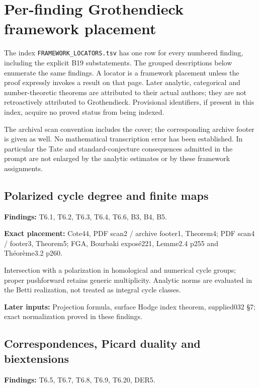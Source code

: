 \documentclass[11pt,a4paper]{article}
\theoremstyle{definition}
\begin{document}
\section{Per-finding Grothendieck framework placement}

The index \texttt{FRAMEWORK\_LOCATORS.tsv} has one row for every
numbered finding, including the explicit B19 substatements. The grouped
descriptions below enumerate the same findings. A locator is a framework
placement unless the proof expressly invokes a result on that page.
Later analytic, categorical and number-theoretic theorems are attributed
to their actual authors; they are not retroactively attributed to
Grothendieck. Provisional identifiers, if present in this index, acquire
no proved status from being indexed.

The archival scan convention includes the cover; the corresponding
archive footer is given as well. No mathematical transcription error has
been established. In particular the Tate and standard-conjecture
consequences admitted in the prompt are not enlarged by the analytic
estimates or by these framework assignments.

\subsection{Polarized cycle degree and finite
maps}\label{FRAMEWORK-polarized-cycle-degree-and-finite-maps}

\textbf{Findings:} T6.1, T6.2, T6.3, T6.4, T6.6, B3, B4, B5.

\textbf{Exact placement:} Cote44, PDF scan2 / archive footer1, Theorem4;
PDF scan4 / footer3, Theorem5; FGA, Bourbaki exposé221, Lemme2.4 p255
and Théorème3.2 p260.

Intersection with a polarization in homological and numerical cycle
groups; proper pushforward retains generic multiplicity. Analytic norms
are evaluated in the Betti realization, not treated as integral cycle
classes.

\textbf{Later inputs:} Projection formula, surface Hodge index theorem,
supplied032 §7; exact normalization proved in these findings.

\subsection{Correspondences, Picard duality and
biextensions}\label{FRAMEWORK-correspondences-picard-duality-and-biextensions}

\textbf{Findings:} T6.5, T6.7, T6.8, T6.9, T6.20, DER5.
\end{document}
